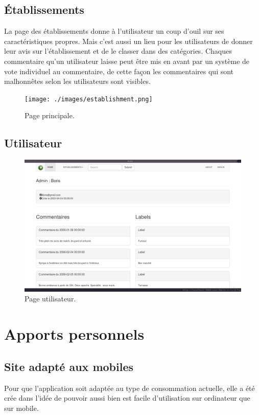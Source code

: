 \documentclass[a4paper,10pt]{article}
\begin{document}
\subsection{Établissements}
La page des établissements donne à l'utilisateur un coup d'ouil sur ses
caractéristiques propres. Mais c'est aussi un lieu pour les utilisateurs de
donner leur avis sur l'établissement et de le classer dans des catégories.
Chaques commentaire qu'un utilisateur laisse peut être mis en avant par un
système de vote individuel au commentaire, de cette façon les commentaires qui
sont malhonnêtes selon les utilisateurs sont visibles.

\begin{figure}[h]
  \centering
  \texttt{[image: ./images/establishment.png]}
  \caption{Page principale.}
\end{figure}

\subsection{Utilisateur}
\begin{figure}[h]
  \centering
  \includegraphics[scale=0.2]{./images/user.png}
  \caption{Page utilisateur.}
\end{figure}

\section{Apports personnels}
\subsection{Site adapté aux mobiles}
    Pour que l'application soit adaptée au type de consommation actuelle, elle
    a été crée dans l'idée de pouvoir aussi bien est facile d'utilisation sur
    ordinateur que sur mobile.
\end{document}
